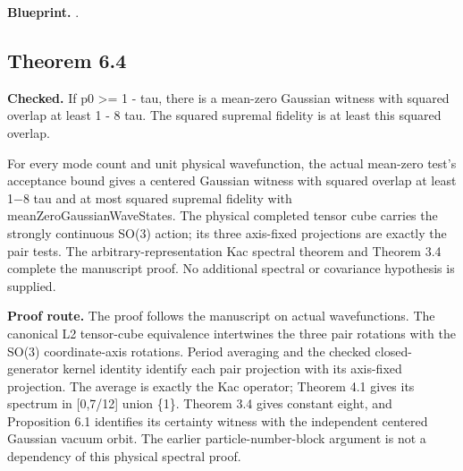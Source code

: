 \textbf{Blueprint.} .

\subsection{Theorem 6.4}\label{paper:r6-4}
\textbf{Checked.} If p0 >= 1 - tau, there is a mean-zero Gaussian witness with squared overlap at least 1 - 8 tau. The squared supremal fidelity is at least this squared overlap. 

For every mode count and unit physical wavefunction, the actual mean-zero test's acceptance bound gives a centered Gaussian witness with squared overlap at least 1−8 tau and at most squared supremal fidelity with meanZeroGaussianWaveStates. The physical completed tensor cube carries the strongly continuous SO(3) action; its three axis-fixed projections are exactly the pair tests. The arbitrary-representation Kac spectral theorem and Theorem 3.4 complete the manuscript proof. No additional spectral or covariance hypothesis is supplied.

\textbf{Proof route.} The proof follows the manuscript on actual wavefunctions. The canonical L2 tensor-cube equivalence intertwines the three pair rotations with the SO(3) coordinate-axis rotations. Period averaging and the checked closed-generator kernel identity identify each pair projection with its axis-fixed projection. The average is exactly the Kac operator; Theorem 4.1 gives its spectrum in [0,7/12] union \{1\}. Theorem 3.4 gives constant eight, and Proposition 6.1 identifies its certainty witness with the independent centered Gaussian vacuum orbit. The earlier particle-number-block argument is not a dependency of this physical spectral proof.


